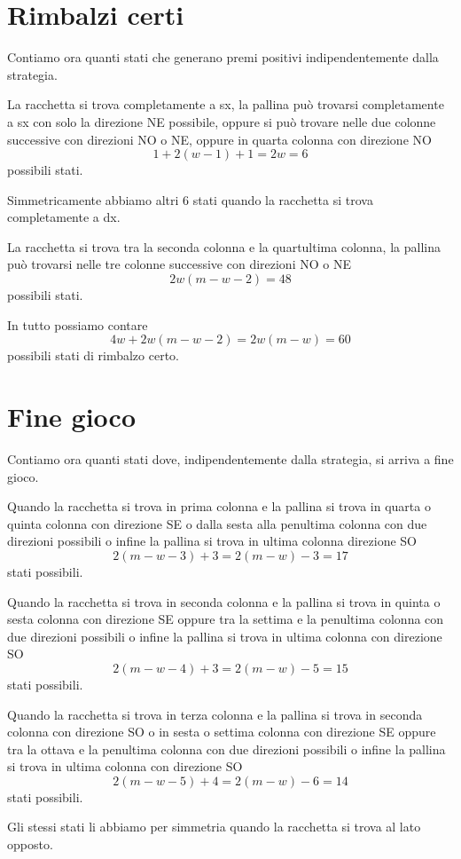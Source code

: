 \documentclass[a4paper,11pt]{article}
\begin{document}
\section{Rimbalzi certi}

Contiamo ora quanti stati che generano premi positivi indipendentemente dalla strategia.

La racchetta si trova completamente a sx, la pallina può trovarsi completamente a sx con solo la direzione NE possibile, oppure si può trovare nelle due colonne successive con direzioni NO o NE, oppure in quarta colonna con direzione NO
\[ 1 + 2(w-1) + 1 = 2w =  6 \]
possibili stati.

Simmetricamente abbiamo altri 6 stati quando la racchetta si trova completamente a dx.

La racchetta si trova tra la seconda colonna e la quartultima colonna, la pallina può trovarsi nelle tre colonne successive con direzioni NO o NE
\[
2w(m-w-2) = 48
\]
possibili stati.

In tutto possiamo contare 
\[
4w+2w(m-w-2) = 2w(m-w)=60
\]
possibili stati di rimbalzo certo.


\section{Fine gioco}

Contiamo ora quanti stati dove, indipendentemente dalla strategia, si arriva a fine gioco.

Quando la racchetta si trova in prima colonna e la pallina si trova in quarta o quinta colonna con direzione SE o dalla sesta alla penultima colonna con due direzioni possibili o infine la pallina si trova in ultima colonna direzione SO
\[
2(m-w-3)+3=2(m-w)-3=17
\]
stati possibili.

Quando la racchetta si trova in seconda colonna e la pallina si trova in quinta o sesta colonna con direzione SE oppure tra la settima e la penultima colonna con due direzioni possibili o infine la pallina si trova in ultima colonna con direzione SO
\[
2(m-w-4)+3 = 2(m-w)-5 = 15
\]
stati possibili.

Quando la racchetta si trova in terza colonna e la pallina si trova in seconda colonna con direzione SO o in sesta o settima colonna con direzione SE oppure tra la ottava e la penultima colonna con due direzioni possibili o infine la pallina si trova in ultima colonna con direzione SO
\[
2(m-w-5)+4= 2(m-w)-6 = 14
\]
stati possibili.

Gli stessi stati li abbiamo per simmetria quando la racchetta si trova al lato opposto.
\end{document}
